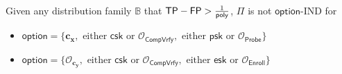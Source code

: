 \begin{theorem}
\label{thm:ind-tp-fp}
Given any distribution family $\mathbb{B}$ that $\textsf{TP} - \textsf{FP} > \frac{1}{\mathsf{poly}}$, $\Pi$ is not $\textsf{option}$-IND for
\begin{itemize}
	\item $\textsf{option} = \{\mathbf{c_x}, \text{ either } \textsf{csk} \text{ or } \mathcal{O}_{\textsf{CompVrfy}}, \text{ either } \textsf{psk} \text{ or } \mathcal{O}_{\textsf{Probe}} \}$

	\item $\textsf{option} = \{\mathcal{O}_{\mathbf{c_y}}, \text{ either } \textsf{csk} \text{ or } \mathcal{O}_{\textsf{CompVrfy}}, \text{ either } \textsf{esk} \text{ or } \mathcal{O}_{\textsf{Enroll}} \}$
\end{itemize}

\end{theorem}

